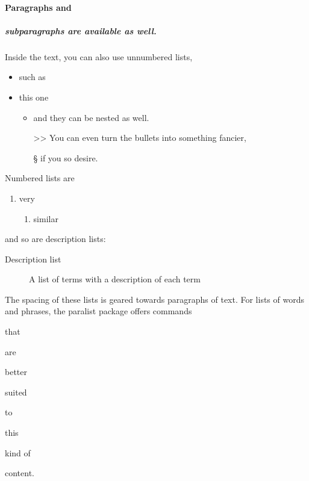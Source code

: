 \documentclass[
  digital, %
  table,   %
  lof,     %
  lot,     %
]{fithesis3}
\begin{document}
\paragraph{Paragraphs and}
\subparagraph{subparagraphs are available as well.}
Inside the text, you can also use unnumbered lists,
\begin{itemize}
  \item such as
  \item this one
  \begin{itemize}
    \item     and they can be nested as well.
    \item[>>] You can even turn the bullets into something fancier,
    \item[\S] if you so desire.
  \end{itemize}
\end{itemize}
Numbered lists are
\begin{enumerate}
  \item very
  \begin{enumerate}
    \item similar
  \end{enumerate}
\end{enumerate}
and so are description lists:
\begin{description}
  \item[Description list]
    A list of terms with a description of each term
\end{description}
The spacing of these lists is geared towards paragraphs of text.
For lists of words and phrases, the \textsf{paralist} package
offers commands
\begin{compactitem}
  \item that
  \begin{compactitem}
    \item are
    \begin{compactitem}
      \item better
      \begin{compactitem}
        \item suited
      \end{compactitem}
    \end{compactitem}
  \end{compactitem}
\end{compactitem}
\begin{compactenum}
  \item to
  \begin{compactenum}
    \item this
    \begin{compactenum}
      \item kind of
      \begin{compactenum}
        \item content.
      \end{compactenum}
    \end{compactenum}
  \end{compactenum}
\end{compactenum}
\end{document}
